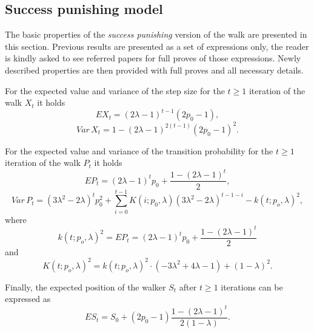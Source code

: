 \documentclass[runningheads]{CMSIM}
\begin{document}
    \subsection{Success punishing model}\label{subsec:success-punishing-model}

    The basic properties of the \emph{success punishing }version of the
    walk are presented in this section.
    Previous results are presented
    as a set of expressions only, the reader is kindly asked to see referred
    papers for full proves of those expressions.
    Newly described properties
    are then provided with full proves and all necessary details.

    For the expected value and variance of the step size for the $t\ge1$
    iteration of the walk $X_{t}$ it holds~\cite{ja2019apmat}
    \begin{equation}
        EX_{t}=(2\lambda-1)^{t-1}(2p_{0}-1),\label{eq:e_x_t_sp}
    \end{equation}
    \begin{equation}
        Var\,X_{t}=1-(2\lambda-1)^{2(t-1)}(2p_{0}-1)^{2}.\label{eq:var_x_t_sp}
    \end{equation}

    For the expected value and variance of the transition probability
    for the $t\ge1$ iteration of the walk $P_{t}$ it holds~\cite{ja2017ddny,ja2019apmat}
    \begin{equation}
        EP_{t}=(2\lambda-1)^{t}p_{0}+\frac{1-(2\lambda-1)^{t}}{2},\label{eq:e_p_t_sp}
    \end{equation}
    \begin{equation}
        Var\,P_{t}=(3\lambda^{2}-2\lambda)^{t}p_{0}^{2}+\sum_{i=0}^{t-1}K(i;p_{0},\lambda)(3\lambda^{2}-2\lambda)^{t-1-i}-k(t;p_{o},\lambda)^{2},\label{eq:var_p_t_sp}
    \end{equation}
    where
    \[
        k(t;p_{o},\lambda)^{2}=EP_{t}=(2\lambda-1)^{t}p_{0}+\frac{1-(2\lambda-1)^{t}}{2}
    \]
    and
    \[
        K(t;p_{o},\lambda)^{2}=k(t;p_{o},\lambda)^{2}\cdot(-3\lambda^{2}+4\lambda-1)+(1-\lambda)^{2}.
    \]

    Finally, the expected position of the walker $S_{t}$ after $t\geq1$
    iterations can be expressed as~\cite{ja2017ddny}
    \begin{equation}
        ES_{t}=S_{0}+(2p_{0}-1)\frac{1-(2\lambda-1)^{t}}{2(1-\lambda)}.\label{eq:e_s_t_sp}
    \end{equation}
\end{document}
